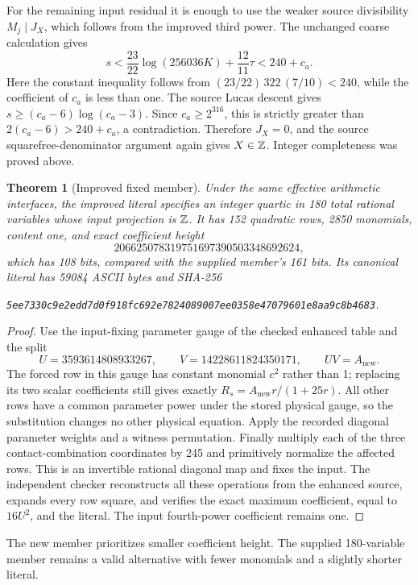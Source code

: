 \documentclass[11pt]{article}
\newtheorem{theorem}{Theorem}
\theoremstyle{remark}\newtheorem{remark}[theorem]{Remark}
\begin{document}
For the remaining input residual it is enough to use the weaker
source divisibility $M_j\mid J_X$, which follows from the improved
third power. The unchanged coarse calculation gives
\[
 s<\frac{23}{22}\log(256036K)+\frac{12}{11}\tau<240+c_a.
\]
Here the constant inequality follows from
$(23/22)\,322\,(7/10)<240$, while the coefficient of $c_a$ is
less than one. The source Lucas descent gives
$s\ge(c_a-6)\log(c_a-3)$. Since $c_a\ge2^{316}$, this is
strictly greater than $2(c_a-6)>240+c_a$, a contradiction.
Therefore $J_X=0$, and the source squarefree-denominator argument
again gives $X\in\mathbb Z$. Integer completeness was proved above.

\begin{theorem}[Improved fixed member]
Under the same effective arithmetic interfaces, the improved literal
specifies an integer quartic in 180 total rational variables whose
input projection is $\mathbb Z$. It has 152 quadratic rows, 2850 monomials,
content one, and exact coefficient height
\[
             206625078319751697390503348692624,
\]
which has 108 bits, compared with the supplied member's 161 bits.
Its canonical literal has 59084 ASCII bytes and SHA-256
\begin{center}\small
\texttt{5ee7330c9e2edd7d0f918fc692e7824089007ee0358e47079601e8aa9c8b4683}.
\end{center}
\end{theorem}
\begin{proof}
Use the input-fixing parameter gauge of the checked enhanced table
and the split
\[
 U=3593614808933267,\qquad V=14228611824350171,
 \qquad UV=A_\mathrm{new}.
\]
The forced row in this gauge has constant monomial $c^2$ rather
than 1; replacing its two scalar coefficients still gives exactly
$R_s=A_\mathrm{new}r/(1+25r)$. All other rows have a common parameter
power under the stored physical gauge, so the substitution changes
no other physical equation. Apply the recorded diagonal parameter
weights and a witness permutation. Finally multiply each of the
three contact-combination coordinates by 245 and primitively
normalize the affected rows. This is an invertible rational diagonal
map and fixes the input. The independent checker reconstructs all
these operations from the enhanced source, expands every row
square, and verifies the exact maximum coefficient, equal to $16U^2$,
and the literal. The input fourth-power coefficient remains one.
\end{proof}
The new member prioritizes smaller coefficient height. The supplied
180-variable member remains a valid alternative with fewer monomials
and a slightly shorter literal.
\end{document}
